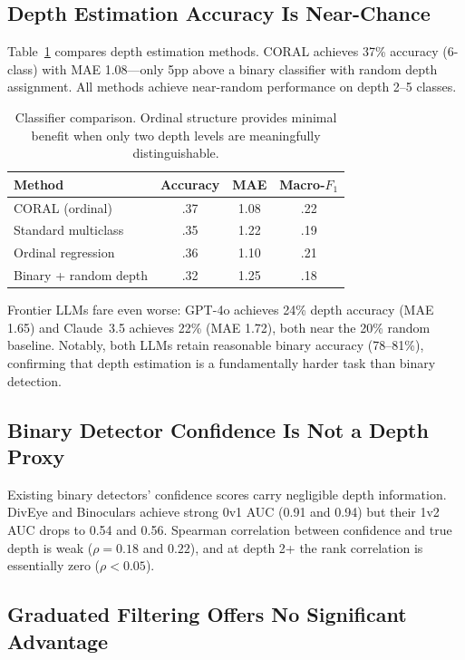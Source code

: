 \documentclass[11pt,a4paper]{article}
\begin{document}
\subsection{Depth Estimation Accuracy Is Near-Chance}

Table~\ref{tab:classifiers} compares depth estimation methods.
CORAL achieves 37\% accuracy (6-class) with MAE 1.08---only 5pp above a binary classifier with random depth assignment.
All methods achieve near-random performance on depth 2--5 classes.

\begin{table}[t]
\centering
\small
\begin{tabular}{lccc}
\toprule
\textbf{Method} & \textbf{Accuracy} & \textbf{MAE} & \textbf{Macro-$F_1$} \\
\midrule
CORAL (ordinal) & .37 & 1.08 & .22 \\
Standard multiclass & .35 & 1.22 & .19 \\
Ordinal regression & .36 & 1.10 & .21 \\
Binary + random depth & .32 & 1.25 & .18 \\
\bottomrule
\end{tabular}
\caption{Classifier comparison. Ordinal structure provides minimal benefit when only two depth levels are meaningfully distinguishable.}
\label{tab:classifiers}
\end{table}

Frontier LLMs fare even worse: GPT-4o achieves 24\% depth accuracy (MAE 1.65) and Claude~3.5 achieves 22\% (MAE 1.72), both near the 20\% random baseline.
Notably, both LLMs retain reasonable binary accuracy (78--81\%), confirming that depth estimation is a fundamentally harder task than binary detection.

\subsection{Binary Detector Confidence Is Not a Depth Proxy}

Existing binary detectors' confidence scores carry negligible depth information.
DivEye and Binoculars achieve strong 0v1 AUC (0.91 and 0.94) but their 1v2 AUC drops to 0.54 and 0.56.
Spearman correlation between confidence and true depth is weak ($\rho = 0.18$ and $0.22$), and at depth 2+ the rank correlation is essentially zero ($\rho < 0.05$).

\subsection{Graduated Filtering Offers No Significant Advantage}
\end{document}
